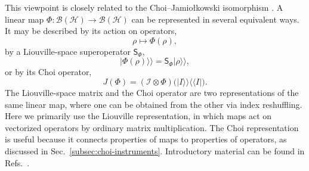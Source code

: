 This viewpoint is closely related to the Choi--Jamio\l{}kowski isomorphism \cite{choi1975completely,jamiolkowski1972linear}.
A linear map \(\Phi:\mathcal B(\mathcal H)\rightarrow\mathcal B(\mathcal H)\) can be represented in several equivalent ways.
It may be described by its action on operators, \[ \rho\longmapsto\Phi(\rho), \] by a Liouville-space superoperator \(\mathsf S_{\Phi}\), \[ \lvert\Phi(\rho)\rangle\!\rangle
    = \mathsf S_{\Phi}\lvert\rho\rangle\!\rangle, \] or by its Choi operator, \[
    J(\Phi)
    = (\mathcal I\otimes\Phi) \bigl( \lvert I\rangle\!\rangle \langle\!\langle I\rvert \bigr).
\]
The Liouville-space matrix and the Choi operator are two representations of the same linear map, where one can be obtained from the other via index reshuffling.
Here we primarily use the Liouville representation, in which maps act on vectorized operators by ordinary matrix multiplication.
The Choi representation is useful because it connects properties of maps to properties of operators, as discussed in Sec.~\ref{subsec:choi-instruments}.
Introductory material can be found in Refs.~\cite{nielsenchuang2010,watrous2018theory}.


